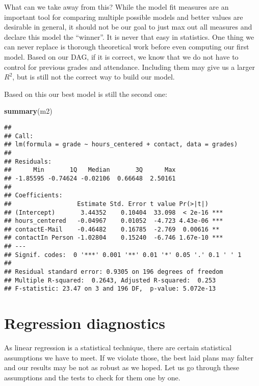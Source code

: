 \documentclass[
]{book}
\newenvironment{Shaded}{\begin{snugshade}}{\end{snugshade}}
\newcommand{\FunctionTok}[1]{\textcolor[rgb]{0.13,0.29,0.53}{\textbf{#1}}}
\newcommand{\NormalTok}[1]{#1}
\begin{document}
What can we take away from this? While the model fit measures are an important
tool for comparing multiple possible models and better values are desirable in
general, it should not be our goal to just max out all measures and declare this
model the ``winner''. It is never that easy in statistics.
One thing we can never replace is thorough theoretical work before even
computing our first model. Based on our DAG, if it is correct, we know that we do not
have to control for previous grades and attendance. Including them may give us a
larger \(R^2\), but is still not the correct way to build our model.

Based on this our best model is still the second one:

\begin{Shaded}
\begin{Highlighting}[]
\FunctionTok{summary}\NormalTok{(m2)}
\end{Highlighting}
\end{Shaded}

\begin{verbatim}
## 
## Call:
## lm(formula = grade ~ hours_centered + contact, data = grades)
## 
## Residuals:
##      Min       1Q   Median       3Q      Max 
## -1.85595 -0.74624 -0.02106  0.66648  2.50161 
## 
## Coefficients:
##                  Estimate Std. Error t value Pr(>|t|)    
## (Intercept)       3.44352    0.10404  33.098  < 2e-16 ***
## hours_centered   -0.04967    0.01052  -4.723 4.43e-06 ***
## contactE-Mail    -0.46482    0.16785  -2.769  0.00616 ** 
## contactIn Person -1.02804    0.15240  -6.746 1.67e-10 ***
## ---
## Signif. codes:  0 '***' 0.001 '**' 0.01 '*' 0.05 '.' 0.1 ' ' 1
## 
## Residual standard error: 0.9305 on 196 degrees of freedom
## Multiple R-squared:  0.2643, Adjusted R-squared:  0.253 
## F-statistic: 23.47 on 3 and 196 DF,  p-value: 5.072e-13
\end{verbatim}

\hypertarget{regression-diagnostics}{%
\section{Regression diagnostics}\label{regression-diagnostics}}

As linear regression is a statistical technique, there are certain statistical
assumptions we have to meet. If we violate those, the best laid plans may
falter and our results may be not as robust as we hoped.
Let us go through these assumptions and the tests to check for them one by one.
\end{document}
